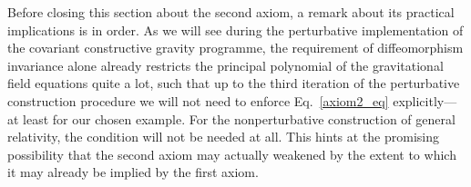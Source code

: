Before closing this section about the second axiom, a remark about its practical implications is in order. As we will see during the perturbative implementation of the covariant constructive gravity programme, the requirement of diffeomorphism invariance alone already restricts the principal polynomial of the gravitational field equations quite a lot, such that up to the third iteration of the perturbative construction procedure we will not need to enforce Eq.\ \ref{axiom2_eq} explicitly---at least for our chosen example. For the nonperturbative construction of general relativity, the condition will not be needed at all. This hints at the promising possibility that the second axiom may actually weakened by the extent to which it may already be implied by the first axiom.

